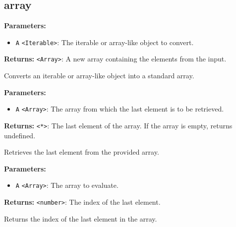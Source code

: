 \documentclass[12pt,a4paper]{article}
\begin{document}
\subsection{array}
\vspace{5mm}
\noindent {}


\noindent \textbf{Parameters:}
\begin{itemize}
  \item \texttt{A} \texttt{<Iterable>}: The iterable or array-like object to convert.
\end{itemize}

\noindent \textbf{Returns:} \texttt{<Array>}: A new array containing the elements from the input.

\noindent Converts an iterable or array-like object into a standard array.

\vspace{5mm}
\noindent {}


\noindent \textbf{Parameters:}
\begin{itemize}
  \item \texttt{A} \texttt{<Array>}: The array from which the last element is to be retrieved.
\end{itemize}

\noindent \textbf{Returns:} \texttt{<*>}: The last element of the array. If the array is empty, returns undefined.

\noindent Retrieves the last element from the provided array.

\vspace{5mm}
\noindent {}


\noindent \textbf{Parameters:}
\begin{itemize}
  \item \texttt{A} \texttt{<Array>}: The array to evaluate.
\end{itemize}

\noindent \textbf{Returns:} \texttt{<number>}: The index of the last element.

\noindent Returns the index of the last element in the array.

\vspace{5mm}
\noindent {}
\end{document}
